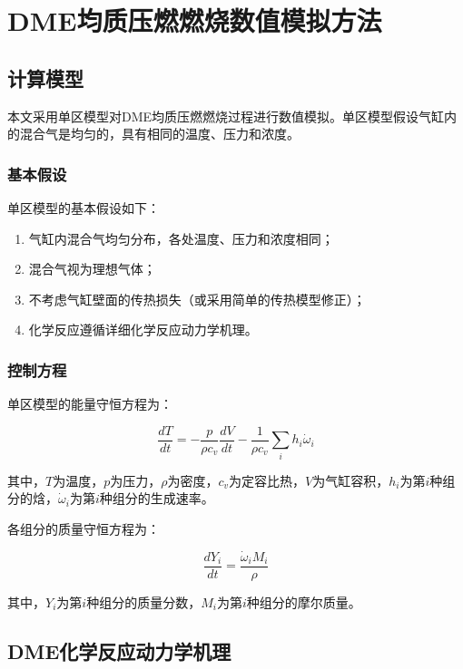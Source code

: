 \chapter{DME均质压燃燃烧数值模拟方法}

\section{计算模型}

本文采用单区模型对DME均质压燃燃烧过程进行数值模拟。单区模型假设气缸内的混合气是均匀的，具有相同的温度、压力和浓度。

\subsection{基本假设}

单区模型的基本假设如下：

\begin{enumerate}
	\item 气缸内混合气均匀分布，各处温度、压力和浓度相同；
	\item 混合气视为理想气体；
	\item 不考虑气缸壁面的传热损失（或采用简单的传热模型修正）；
	\item 化学反应遵循详细化学反应动力学机理。
\end{enumerate}

\subsection{控制方程}

单区模型的能量守恒方程为：

\begin{equation}
	\frac{dT}{dt} = -\frac{p}{\rho c_v}\frac{dV}{dt} - \frac{1}{\rho c_v}\sum_i h_i \dot{\omega}_i
	\label{eq:energy}
\end{equation}

其中，$T$为温度，$p$为压力，$\rho$为密度，$c_v$为定容比热，$V$为气缸容积，$h_i$为第$i$种组分的焓，$\dot{\omega}_i$为第$i$种组分的生成速率。

各组分的质量守恒方程为：

\begin{equation}
	\frac{dY_i}{dt} = \frac{\dot{\omega}_i M_i}{\rho}
	\label{eq:species}
\end{equation}

其中，$Y_i$为第$i$种组分的质量分数，$M_i$为第$i$种组分的摩尔质量。

\section{DME化学反应动力学机理}

